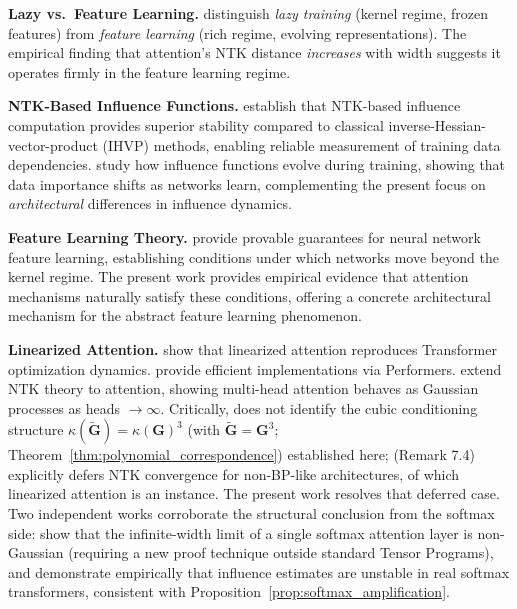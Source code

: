 \documentclass{article}
\theoremstyle{plain}
\theoremstyle{definition}
\theoremstyle{remark}
\begin{document}
\textbf{Lazy vs.\ Feature Learning.} \citet{chizat2019lazy} distinguish \emph{lazy training} (kernel regime, frozen features) from \emph{feature learning} (rich regime, evolving representations). The empirical finding that attention's NTK distance \emph{increases} with width suggests it operates firmly in the feature learning regime.

\textbf{NTK-Based Influence Functions.} \citet{zhang2022rethinking} establish that NTK-based influence computation provides superior stability compared to classical inverse-Hessian-vector-product (IHVP) methods, enabling reliable measurement of training data dependencies. \citet{loo2022evolution} study how influence functions evolve during training, showing that data importance shifts as networks learn, complementing the present focus on \emph{architectural} differences in influence dynamics.

\textbf{Feature Learning Theory.} \citet{nichani2025provable} provide provable guarantees for neural network feature learning, establishing conditions under which networks move beyond the kernel regime. The present work provides empirical evidence that attention mechanisms naturally satisfy these conditions, offering a concrete architectural mechanism for the abstract feature learning phenomenon.

\textbf{Linearized Attention.} \citet{ahn2024linear} show that linearized attention reproduces Transformer optimization dynamics. \citet{choromanski2020rethinking} provide efficient implementations via Performers. \citet{hron2020infinite} extend NTK theory to attention, showing multi-head attention behaves as Gaussian processes as heads $\to \infty$. Critically, \citet{hron2020infinite} does not identify the cubic conditioning structure $\kappa(\tilde{\mathbf{G}}) = \kappa(\mathbf{G})^3$ (with $\tilde{\mathbf{G}} = \mathbf{G}^3$; Theorem~\ref{thm:polynomial_correspondence}) established here; \citet{yang2020tensor} (Remark 7.4) explicitly defers NTK convergence for non-BP-like architectures, of which linearized attention is an instance. The present work resolves that deferred case. Two independent works corroborate the structural conclusion from the softmax side: \citet{sakai2025nngp} show that the infinite-width limit of a single softmax attention layer is non-Gaussian (requiring a new proof technique outside standard Tensor Programs), and \citet{bae2022ifsanswer} demonstrate empirically that influence estimates are unstable in real softmax transformers, consistent with Proposition~\ref{prop:softmax_amplification}.
\end{document}
